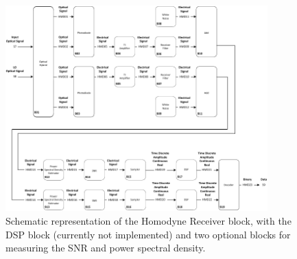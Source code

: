 	\begin{figure}[]
	\centering
	\includegraphics[width=0.9\textwidth]
	{./sdf/m_qam_system/figures/simulations/blockDiagrams/simulation_rx_wSNRAndPSD}
	\caption{Schematic representation of the Homodyne Receiver block, with the 
	DSP block (currently not implemented) and 
	two optional blocks for measuring the SNR and power spectral 
	density.}\label{fig:sim_rxDiagram}
\end{figure}


	\clearpage

